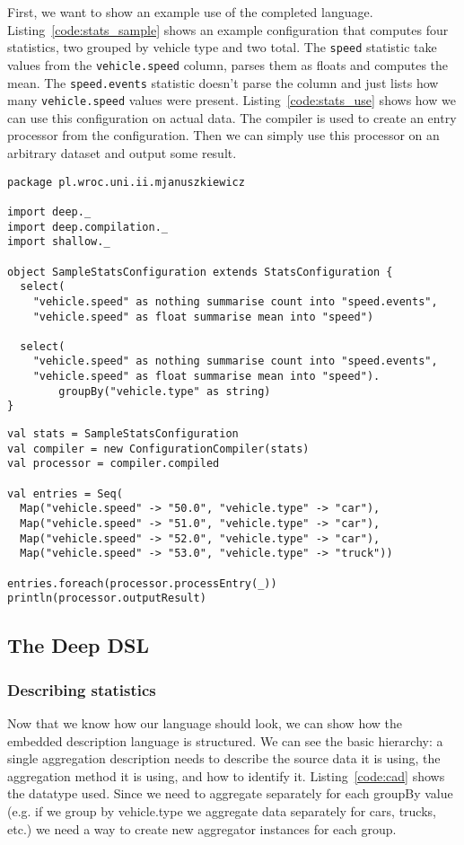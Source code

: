 First, we want to show an example use of the completed language.
Listing~\ref{code:stats_sample} shows an example configuration that computes four statistics, two grouped by vehicle type and two total.
The \texttt{speed} statistic take values from the \texttt{vehicle.speed} column, parses them as floats and computes the mean.
The \texttt{speed.events} statistic doesn't parse the column and just lists how many \texttt{vehicle.speed} values were present.
Listing~\ref{code:stats_use} shows how we can use this configuration on actual data.
The compiler is used to create an entry processor from the configuration.
Then we can simply use this processor on an arbitrary dataset and output some result.

\begin{lstlisting}[caption=Defined statistics, label=code:stats_sample]
package pl.wroc.uni.ii.mjanuszkiewicz

import deep._
import deep.compilation._
import shallow._

object SampleStatsConfiguration extends StatsConfiguration {
  select(
    "vehicle.speed" as nothing summarise count into "speed.events",
    "vehicle.speed" as float summarise mean into "speed")

  select(
    "vehicle.speed" as nothing summarise count into "speed.events",
    "vehicle.speed" as float summarise mean into "speed").
		groupBy("vehicle.type" as string)
}
\end{lstlisting}

\begin{lstlisting}[caption=Using statistics, label=code:stats_use]
val stats = SampleStatsConfiguration
val compiler = new ConfigurationCompiler(stats)
val processor = compiler.compiled

val entries = Seq(
  Map("vehicle.speed" -> "50.0", "vehicle.type" -> "car"),
  Map("vehicle.speed" -> "51.0", "vehicle.type" -> "car"),
  Map("vehicle.speed" -> "52.0", "vehicle.type" -> "car"),
  Map("vehicle.speed" -> "53.0", "vehicle.type" -> "truck"))

entries.foreach(processor.processEntry(_))
println(processor.outputResult)
\end{lstlisting}

\subsection{The Deep DSL}

\subsubsection{Describing statistics}
Now that we know how our language should look, we can show how the embedded description language is structured.
We can see the basic hierarchy: a single aggregation description needs to describe the source data it is using, the aggregation method it is using, and how to identify it.
Listing~\ref{code:cad} shows the datatype used.
Since we need to aggregate separately for each groupBy value (e.g. if we group by vehicle.type we aggregate data separately for cars, trucks, etc.) we need a way to create new aggregator instances for each group.

